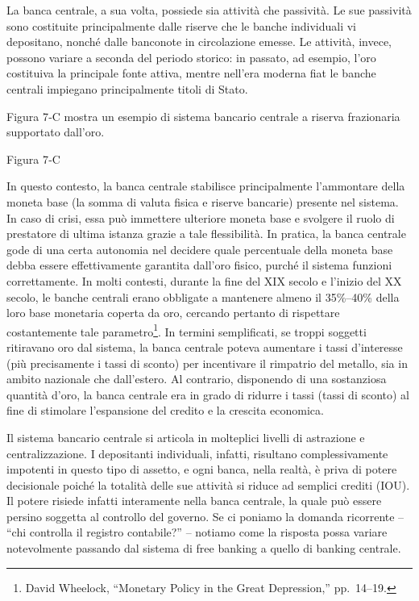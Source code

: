 \documentclass[
  a5paper,
  smalldemyvopaper,10pt,twoside,onecolumn,openright,extrafontsizes,hidelinks]{memoir}
\begin{document}
La banca centrale, a sua volta, possiede sia attività che passività. Le
sue passività sono costituite principalmente dalle riserve che le banche
individuali vi depositano, nonché dalle banconote in circolazione
emesse. Le attività, invece, possono variare a seconda del periodo
storico: in passato, ad esempio, l'oro costituiva la principale fonte
attiva, mentre nell'era moderna fiat le banche centrali impiegano
principalmente titoli di Stato.

Figura 7‑C mostra un esempio di sistema bancario centrale a riserva
frazionaria supportato dall'oro.

Figura 7‑C

In questo contesto, la banca centrale stabilisce principalmente
l'ammontare della moneta base (la somma di valuta fisica e riserve
bancarie) presente nel sistema. In caso di crisi, essa può immettere
ulteriore moneta base e svolgere il ruolo di prestatore di ultima
istanza grazie a tale flessibilità. In pratica, la banca centrale gode
di una certa autonomia nel decidere quale percentuale della moneta base
debba essere effettivamente garantita dall'oro fisico, purché il sistema
funzioni correttamente. In molti contesti, durante la fine del XIX
secolo e l'inizio del XX secolo, le banche centrali erano obbligate a
mantenere almeno il 35\%--40\% della loro base monetaria coperta da oro,
cercando pertanto di rispettare costantemente tale parametro\footnote{David
  Wheelock, ``Monetary Policy in the Great Depression,'' pp.~14--19.}.
In termini semplificati, se troppi soggetti ritiravano oro dal sistema,
la banca centrale poteva aumentare i tassi d'interesse (più precisamente
i tassi di sconto) per incentivare il rimpatrio del metallo, sia in
ambito nazionale che dall'estero. Al contrario, disponendo di una
sostanziosa quantità d'oro, la banca centrale era in grado di ridurre i
tassi (tassi di sconto) al fine di stimolare l'espansione del credito e
la crescita economica.

Il sistema bancario centrale si articola in molteplici livelli di
astrazione e centralizzazione. I depositanti individuali, infatti,
risultano complessivamente impotenti in questo tipo di assetto, e ogni
banca, nella realtà, è priva di potere decisionale poiché la totalità
delle sue attività si riduce ad semplici crediti (IOU). Il potere
risiede infatti interamente nella banca centrale, la quale può essere
persino soggetta al controllo del governo. Se ci poniamo la domanda
ricorrente -- ``chi controlla il registro contabile?'' -- notiamo come
la risposta possa variare notevolmente passando dal sistema di free
banking a quello di banking centrale.
\end{document}
